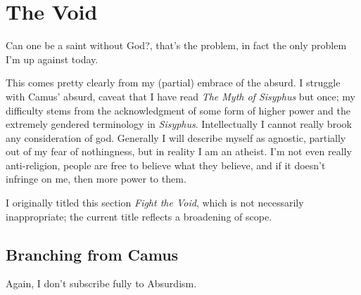 \documentclass[../butidigress.tex]{subfiles}
\begin{document}
\chapter{The Void}  %
\epigraph{Can one be a saint without God?, that's the problem, in fact the only problem I'm up against today.}{}
\newpage
This comes pretty clearly from my (partial) embrace of the absurd.
I struggle with Camus' absurd, caveat that I have read \textit{The Myth of Sisyphus} but once; my difficulty stems from the acknowledgment of some form of higher power and the extremely gendered terminology in \textit{Sisyphus}.
Intellectually I cannot really brook any consideration of god.
Generally I will describe myself as agnostic, partially out of my fear of nothingness, but in reality I am an atheist.
I'm not even really anti-religion, people are free to believe what they believe, and if it doesn't infringe on me, then more power to them.

I originally titled this section \textit{Fight the Void}, which is not necessarily inappropriate; the current title reflects a broadening of scope.

\section{Branching from Camus}
Again, I don't subscribe fully to Absurdism.
\end{document}
